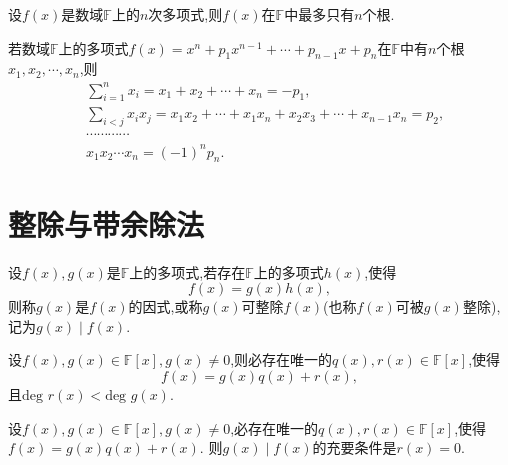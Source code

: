 \documentclass[lang=cn,newtx,10pt,scheme=chinese]{elegantbook}
\begin{document}
\begin{theorem}[多项式根的有限性]\label{theorem:多项式根的有限性}
    设\(f(x)\)是数域\(\mathbb{F}\)上的\(n\)次多项式,则\(f(x)\)在\(\mathbb{F}\)中最多只有\(n\)个根.
\end{theorem}

\begin{theorem}[Vieta定理]\label{theorem:Vieta定理}
若数域\(\mathbb{F}\)上的多项式\(f(x)=x^n + p_1x^{n - 1}+\cdots + p_{n - 1}x + p_n\)在\(\mathbb{F}\)中有\(n\)个根\(x_1,x_2,\cdots,x_n\),则
\begin{align*}
&\sum_{i = 1}^{n}x_i=x_1 + x_2+\cdots + x_n=-p_1,\\
&\sum_{i < j}x_ix_j=x_1x_2+\cdots + x_1x_n + x_2x_3+\cdots + x_{n - 1}x_n=p_2,\\
&\cdots\cdots\cdots\cdots\\
&x_1x_2\cdots x_n=(-1)^np_n.
\end{align*}
\end{theorem}


\section{整除与带余除法}

\begin{definition}[整除的定义]\label{definition:整除的定义}
    设\(f(x),g(x)\)是\(\mathbb{F}\)上的多项式,若存在\(\mathbb{F}\)上的多项式\(h(x)\),使得
    \[
    f(x)=g(x)h(x),
    \]
    则称\(g(x)\)是\(f(x)\)的因式,或称\(g(x)\)可整除\(f(x)\)(也称\(f(x)\)可被\(g(x)\)整除),记为\(g(x)\mid f(x)\).
    
    \end{definition}
    
    \begin{theorem}\label{theorem:多项式的带余除法}
    设\(f(x),g(x)\in\mathbb{F}[x],g(x)\neq 0\),则必存在唯一的\(q(x),r(x)\in\mathbb{F}[x]\),使得
    \[
    f(x)=g(x)q(x)+r(x),
    \]
    且\(\text{deg }r(x)<\text{deg }g(x)\).
    \end{theorem}
    
    \begin{corollary}\label{corollary:整除关于多项式的带余除法的充要条件}
    设\(f(x),g(x)\in\mathbb{F}[x],g(x)\neq 0\),必存在唯一的\(q(x),r(x)\in\mathbb{F}[x]\),使得$f(x)=g(x)q(x)+r(x)$. 
    则\(g(x)\mid f(x)\)的充要条件是\(r(x)=0\).
\end{corollary}
\end{document}
